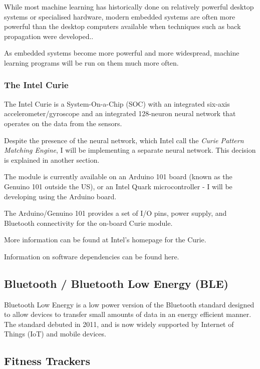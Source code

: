 \documentclass[a4paper]{article}
\begin{document}
While most machine learning has historically done on relatively powerful desktop systems or specialised hardware, modern embedded systems are often more powerful than the desktop computers available when techniques such as back propagation were developed.\cite{bgref5}. 

As embedded systems become more powerful and more widespread, machine learning programs will be run on them much more often.

\subsubsection{The Intel Curie}

The Intel Curie is a System-On-a-Chip (SOC) with an integrated six-axis accelerometer/gyroscope and an integrated 128-neuron neural network that operates on the data from the sensors.

Despite the presence of the neural network, which Intel call the \textit{Curie Pattern Matching Engine}\cite{bgref6}, I will be implementing a separate neural network. This decision is explained in another section. 

The module is currently available on an Arduino 101 board (known as the Genuino 101 outside the US), or an Intel Quark microcontroller - I will be developing using the Arduino board.

The Arduino/Genuino 101 provides a set of I/O pins, power supply, and Bluetooth connectivity for the on-board Curie module.

More information can be found at Intel's homepage for the Curie\cite{bgref6}.

Information on software dependencies can be found here. 

\subsection{Bluetooth / Bluetooth Low Energy (BLE)}%

Bluetooth Low Energy\cite{bgref7} is a low power version of the Bluetooth standard designed to allow devices to transfer small amounts of data in an energy efficient manner. The standard debuted in 2011, and is now widely supported by Internet of Things (IoT) and mobile devices.

\subsection{Fitness Trackers}%
\end{document}
